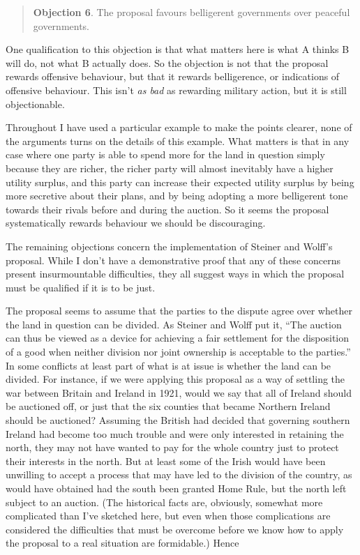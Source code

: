 \documentclass[
  10pt,
  letterpaper,
  DIV=11,
  numbers=noendperiod,
  twoside]{scrartcl}
\begin{document}
\begin{quote}
\textbf{Objection 6}. The proposal favours belligerent governments over
peaceful governments.
\end{quote}

One qualification to this objection is that what matters here is what A
thinks B will do, not what B actually does. So the objection is not that
the proposal rewards offensive behaviour, but that it rewards
belligerence, or indications of offensive behaviour. This isn't \emph{as
bad} as rewarding military action, but it is still objectionable.

Throughout I have used a particular example to make the points clearer,
none of the arguments turns on the details of this example. What matters
is that in any case where one party is able to spend more for the land
in question simply because they are richer, the richer party will almost
inevitably have a higher utility surplus, and this party can increase
their expected utility surplus by being more secretive about their
plans, and by being adopting a more belligerent tone towards their
rivals before and during the auction. So it seems the proposal
systematically rewards behaviour we should be discouraging.

The remaining objections concern the implementation of Steiner and
Wolff's proposal. While I don't have a demonstrative proof that any of
these concerns present insurmountable difficulties, they all suggest
ways in which the proposal must be qualified if it is to be just.

The proposal seems to assume that the parties to the dispute agree over
whether the land in question can be divided. As Steiner and Wolff put
it, ``The auction can thus be viewed as a device for achieving a fair
settlement for the disposition of a good when neither division nor joint
ownership is acceptable to the parties.'' In some conflicts at least
part of what is at issue is whether the land can be divided. For
instance, if we were applying this proposal as a way of settling the war
between Britain and Ireland in 1921, would we say that all of Ireland
should be auctioned off, or just that the six counties that became
Northern Ireland should be auctioned? Assuming the British had decided
that governing southern Ireland had become too much trouble and were
only interested in retaining the north, they may not have wanted to pay
for the whole country just to protect their interests in the north. But
at least some of the Irish would have been unwilling to accept a process
that may have led to the division of the country, as would have obtained
had the south been granted Home Rule, but the north left subject to an
auction. (The historical facts are, obviously, somewhat more complicated
than I've sketched here, but even when those complications are
considered the difficulties that must be overcome before we know how to
apply the proposal to a real situation are formidable.) Hence
\end{document}
